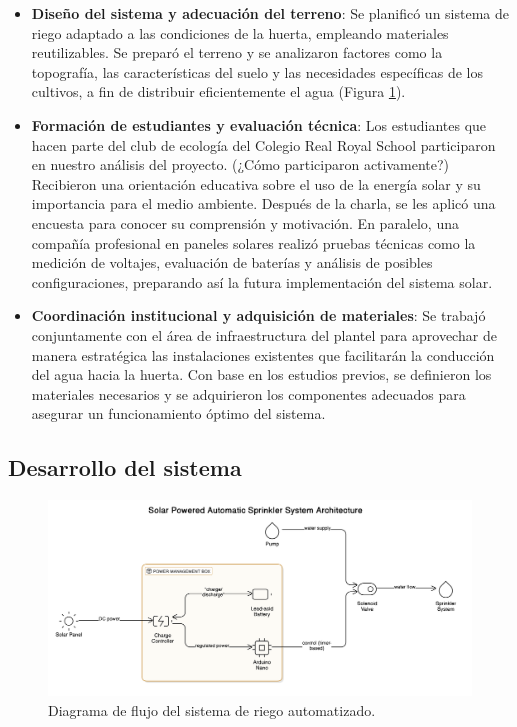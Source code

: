 \documentclass[12pt]{article}
\begin{document}
\begin{itemize}
      \item \textbf{Diseño del sistema y adecuación del terreno}: Se planificó un sistema de riego adaptado a las condiciones de la huerta, empleando materiales reutilizables. Se preparó el terreno y se analizaron factores como la topografía, las características del suelo y las necesidades específicas de los cultivos, a fin de distribuir eficientemente el agua (Figura \ref{fig:diagrama}).
      \item \textbf{Formación de estudiantes y evaluación técnica}: Los estudiantes que hacen parte del club de ecología del Colegio Real Royal School participaron en nuestro análisis del proyecto. (¿Cómo participaron activamente?) Recibieron una orientación educativa sobre el uso de la energía solar y su importancia para el medio ambiente. Después de la charla, se les aplicó una encuesta para conocer su comprensión y motivación. En paralelo, una compañía profesional en paneles solares realizó pruebas técnicas como la medición de voltajes, evaluación de baterías y análisis de posibles configuraciones, preparando así la futura implementación del sistema solar.
      \item \textbf{Coordinación institucional y adquisición de materiales}: Se trabajó conjuntamente con el área de infraestructura del plantel para aprovechar de manera estratégica las instalaciones existentes que facilitarán la conducción del agua hacia la huerta. Con base en los estudios previos, se definieron los materiales necesarios y se adquirieron los componentes adecuados para asegurar un funcionamiento óptimo del sistema.
\end{itemize}




\subsection{Desarrollo del sistema}

\begin{figure}[htbp]
      \centering
      \includegraphics[width=1\textwidth]{imagenes/diagram.png}
      \caption{Diagrama de flujo del sistema de riego automatizado.}
      \label{fig:diagrama}
\end{figure}
\end{document}
